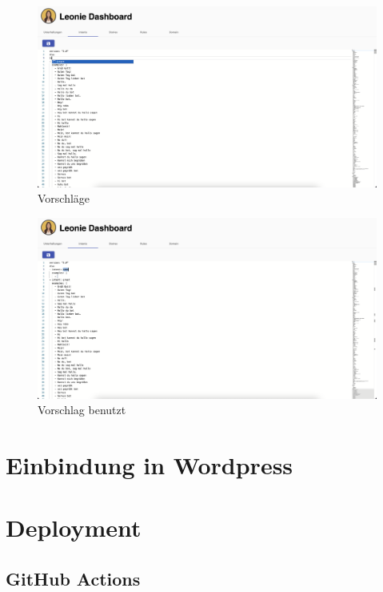 \begin{figure}[hbt!]
    \centering
    \includegraphics[scale=0.2]{pics/dashboardCodeSuggestion}
    \caption{Vorschläge}
    \label{fig:impl:dashboardCodeSuggestion}
\end{figure}
\begin{figure}[hbt!]
    \centering
    \includegraphics[scale=0.2]{pics/dashboardSuggestionMade}
    \caption{Vorschlag benutzt}
    \label{fig:impl:dashboardCodeSuggestionMade}
\end{figure}



\section{Einbindung in Wordpress}

\section{Deployment}

\subsection{GitHub Actions}

